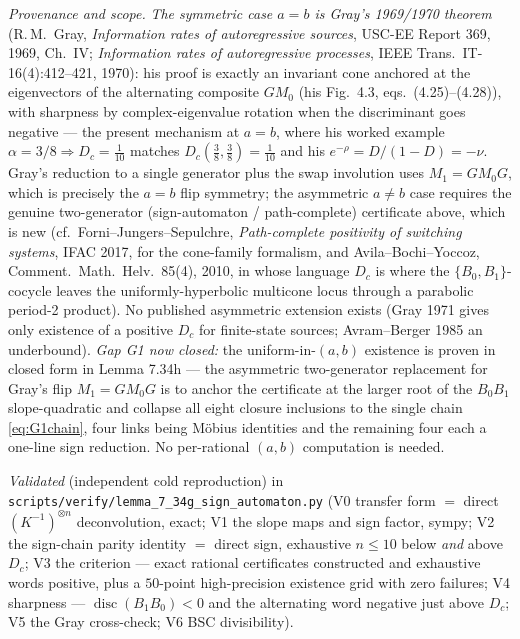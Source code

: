 \documentclass[
]{article}
\begin{document}
\emph{Provenance and scope.} \emph{The symmetric case $a=b$ is Gray's 1969/1970
theorem} (R.\,M.\ Gray, \emph{Information rates of autoregressive sources}, USC-EE
Report 369, 1969, Ch.\ IV; \emph{Information rates of autoregressive processes},
IEEE Trans.\ IT-16(4):412--421, 1970): his proof is exactly an invariant cone
anchored at the eigenvectors of the alternating composite $GM_0$ (his
Fig.\ 4.3, eqs.\ (4.25)--(4.28)), with sharpness by complex-eigenvalue rotation
when the discriminant goes negative --- the present mechanism at $a=b$, where his
worked example $\alpha=3/8\Rightarrow D_c=\tfrac1{10}$ matches
$D_c(\tfrac38,\tfrac38)=\tfrac1{10}$ and his $e^{-\rho}=D/(1-D)=-\nu$. Gray's
reduction to a single generator plus the swap involution uses $M_1=GM_0G$,
which is precisely the $a=b$ flip symmetry; the asymmetric $a\ne b$ case
requires the genuine two-generator (sign-automaton / path-complete) certificate
above, which is new (cf.\ Forni--Jungers--Sepulchre, \emph{Path-complete
positivity of switching systems}, IFAC 2017, for the cone-family formalism, and
Avila--Bochi--Yoccoz, Comment.\ Math.\ Helv.\ 85(4), 2010, in whose language
$D_c$ is where the $\{B_0,B_1\}$-cocycle leaves the uniformly-hyperbolic
multicone locus through a parabolic period-2 product). No published asymmetric
extension exists (Gray 1971 gives only existence of a positive $D_c$ for
finite-state sources; Avram--Berger 1985 an underbound). \emph{Gap G1 now
closed:} the uniform-in-$(a,b)$ existence is proven in closed form in
Lemma 7.34h --- the asymmetric two-generator replacement for Gray's flip
$M_1=GM_0G$ is to anchor the certificate at the larger root of the
$B_0B_1$ slope-quadratic and collapse all eight closure inclusions to the
single chain \eqref{eq:G1chain}, four links being M\"obius identities and the
remaining four each a one-line sign reduction. No per-rational $(a,b)$
computation is needed.

\emph{Validated} (independent cold reproduction) in
\texttt{scripts/verify/lemma\_7\_34g\_sign\_automaton.py} (V0 transfer form
$=$ direct $(K^{-1})^{\otimes n}$ deconvolution, exact; V1 the slope maps and
sign factor, sympy; V2 the sign-chain parity identity $=$ direct sign,
exhaustive $n\le10$ below \emph{and} above $D_c$; V3 the criterion --- exact
rational certificates constructed and exhaustive words positive, plus a
$50$-point high-precision existence grid with zero failures; V4 sharpness ---
$\operatorname{disc}(B_1B_0)<0$ and the alternating word negative just above
$D_c$; V5 the Gray cross-check; V6 BSC divisibility).
\end{document}
